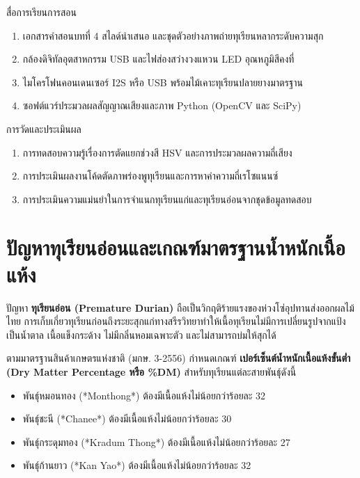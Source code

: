 \begin{planbox}{สื่อการเรียนการสอน}
\begin{enumerate}[topsep=2pt, itemsep=1pt, partopsep=0pt, parsep=0pt, leftmargin=1.5em]
    \item เอกสารคำสอนบทที่ 4 สไลด์นำเสนอ และชุดตัวอย่างภาพถ่ายทุเรียนหลากระดับความสุก
    \item กล้องดิจิทัลอุตสาหกรรม USB และไฟส่องสว่างวงแหวน LED อุณหภูมิสีคงที่
    \item ไมโครโฟนคอนเดนเซอร์ I2S หรือ USB พร้อมไม้เคาะทุเรียนปลายยางมาตรฐาน
    \item ซอฟต์แวร์ประมวลผลสัญญาณเสียงและภาพ Python (OpenCV และ SciPy)
\end{enumerate}
\end{planbox}

\begin{planbox}{การวัดและประเมินผล}
\begin{enumerate}[topsep=2pt, itemsep=1pt, partopsep=0pt, parsep=0pt, leftmargin=1.5em]
    \item การทดสอบความรู้เรื่องการตัดแยกช่วงสี HSV และการประมวลผลความถี่เสียง
    \item การประเมินผลงานโค้ดตัดภาพร่องพูทุเรียนและการหาค่าความถี่เรโซแนนซ์
    \item การประเมินความแม่นยำในการจำแนกทุเรียนแก่และทุเรียนอ่อนจากชุดข้อมูลทดสอบ
\end{enumerate}
\end{planbox}

\clearpage

\section{ปัญหาทุเรียนอ่อนและเกณฑ์มาตรฐานน้ำหนักเนื้อแห้ง}

ปัญหา \textbf{ทุเรียนอ่อน (Premature Durian)} ถือเป็นวิกฤติร้ายแรงของห่วงโซ่อุปทานส่งออกผลไม้ไทย การเก็บเกี่ยวทุเรียนก่อนถึงระยะสุกแก่ทางสรีรวิทยาทำให้เนื้อทุเรียนไม่มีการเปลี่ยนรูปจากแป้งเป็นน้ำตาล เนื้อแข็งกระด้าง ไม่มีกลิ่นหอมเฉพาะตัว และไม่สามารถบ่มให้สุกได้

ตามมาตรฐานสินค้าเกษตรแห่งชาติ (มกษ. 3-2556) กำหนดเกณฑ์ \textbf{เปอร์เซ็นต์น้ำหนักเนื้อแห้งขั้นต่ำ (Dry Matter Percentage หรือ \%DM)} สำหรับทุเรียนแต่ละสายพันธุ์ดังนี้
\begin{itemize}[leftmargin=1.5em]
    \item พันธุ์หมอนทอง (*Monthong*) ต้องมีเนื้อแห้งไม่น้อยกว่าร้อยละ 32
    \item พันธุ์ชะนี (*Chanee*) ต้องมีเนื้อแห้งไม่น้อยกว่าร้อยละ 30
    \item พันธุ์กระดุมทอง (*Kradum Thong*) ต้องมีเนื้อแห้งไม่น้อยกว่าร้อยละ 27
    \item พันธุ์ก้านยาว (*Kan Yao*) ต้องมีเนื้อแห้งไม่น้อยกว่าร้อยละ 32
\end{itemize}


